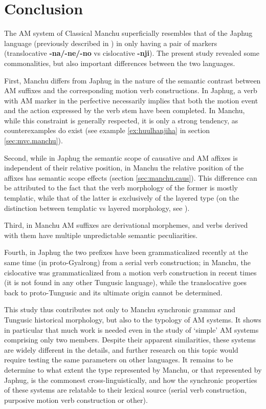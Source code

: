 \documentclass{article}
\newcommand{\ipa}[1]{\textbf{{\phon\mbox{#1}}}} %
\begin{document}
\section{Conclusion}
The AM system of Classical Manchu superficially resembles that of the Japhug language (previously described in \citealt{jacques13harmonization}) in only having a pair of markers (translocative \ipa{-na/-ne/-no} vs cislocative \ipa{-nji}). The present study revealed some commonalities, but also important differences between the two languages. 

First, Manchu differs from Japhug in the nature of the semantic contrast between AM suffixes and the corresponding motion verb constructions. In Japhug, a verb with AM marker in the perfective necessarily implies that both the motion event and the action expressed by the verb stem have been completed. In Manchu, while this constraint is generally respected, it is only a strong tendency, as counterexamples do exist (see example \ref{ex:huulhanjiha} in section \ref{sec:mvc.manchu}).

Second, while in Japhug the semantic scope of causative and AM affixes is independent of their relative position, in Manchu the relative position of the affixes has semantic scope effects (section \ref{sec:manchu.caus}). This difference can be attributed to the fact that the verb morphology of the former is mostly templatic, while that of the latter is exclusively of the layered type (on the distinction between templatic vs layered morphology, see \citealt{bickel07inflectional}).

Third, in Manchu AM suffixes are derivational morphemes, and   verbs derived with them have multiple unpredictable semantic peculiarities.

Fourth, in Japhug the two prefixes have been grammaticalized recently at the same time (in proto-Gyalrong) from a serial verb construction; in Manchu, the cislocative was grammaticalized from a motion verb construction in recent times (it is not found in any other Tungusic language), while the translocative goes back to proto-Tungusic and its ultimate origin cannot be determined.


This study thus contributes not only to Manchu synchronic grammar and Tungusic historical morphology, but also to the typology of AM systems. It shows in particular that much work is needed even in the study of `simple' AM systems comprising only two members. Despite their apparent similarities, these systems are widely different in the details, and further research on this topic would require testing the same parameters on other languages. It remains to be determine to what extent the type represented by Manchu, or that represented by Japhug, is the commonest cross-linguistically, and how the synchronic properties of these systems are relatable to their lexical source (serial verb construction, purposive motion verb construction or other).




 
\end{document}
